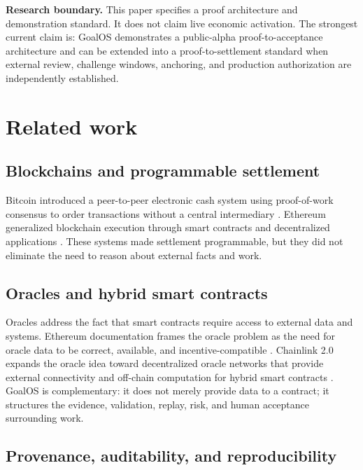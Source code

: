 \documentclass[11pt]{article}
\begin{document}
\begin{boundarybox}
\textbf{Research boundary.} This paper specifies a proof architecture and demonstration standard. It does not claim live economic activation. The strongest current claim is: GoalOS demonstrates a public-alpha proof-to-acceptance architecture and can be extended into a proof-to-settlement standard when external review, challenge windows, anchoring, and production authorization are independently established.
\end{boundarybox}

\section{Related work}

\subsection{Blockchains and programmable settlement}

Bitcoin introduced a peer-to-peer electronic cash system using proof-of-work consensus to order transactions without a central intermediary \citep{nakamoto2008bitcoin}. Ethereum generalized blockchain execution through smart contracts and decentralized applications \citep{buterin2014ethereum}. These systems made settlement programmable, but they did not eliminate the need to reason about external facts and work.

\subsection{Oracles and hybrid smart contracts}

Oracles address the fact that smart contracts require access to external data and systems. Ethereum documentation frames the oracle problem as the need for oracle data to be correct, available, and incentive-compatible \citep{ethereumOracles}. Chainlink 2.0 expands the oracle idea toward decentralized oracle networks that provide external connectivity and off-chain computation for hybrid smart contracts \citep{chainlink2}. GoalOS is complementary: it does not merely provide data to a contract; it structures the evidence, validation, replay, risk, and human acceptance surrounding work.

\subsection{Provenance, auditability, and reproducibility}
\end{document}
